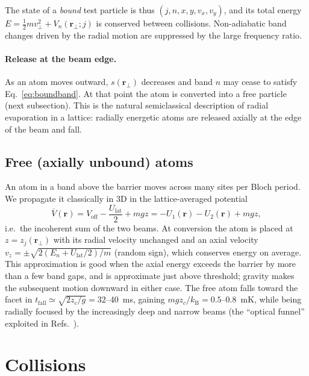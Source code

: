 \documentclass[11pt,a4paper]{article}
\newcommand{\kB}{k_\mathrm{B}}
\newcommand{\Ulat}{U_\mathrm{lat}}
\newcommand{\Voff}{V_\mathrm{off}}
\newcommand{\rperp}{\bm{r}_\perp}
\begin{document}
The state of a \emph{bound} test particle is thus $(j,n,x,y,v_x,v_y)$, and its total energy $E=\frac12 m v_\perp^2+V_n(\rperp;j)$ is conserved between collisions. Non-adiabatic band changes driven by the radial motion are suppressed by the large frequency ratio.

\paragraph{Release at the beam edge.} As an atom moves outward, $s(\rperp)$ decreases and band $n$ may cease to satisfy Eq.~\eqref{eq:boundband}. At that point the atom is converted into a free particle (next subsection). This is the natural semiclassical description of radial evaporation in a lattice: radially energetic atoms are released axially at the edge of the beam and fall.

\subsection{Free (axially unbound) atoms}
An atom in a band above the barrier moves across many sites per Bloch period. We propagate it classically in 3D in the lattice-averaged potential
\begin{equation}
\overline V(\bm r)=\Voff-\frac{\Ulat}{2}+mgz=-U_1(\bm r)-U_2(\bm r)+mgz ,
\label{eq:Vavg}
\end{equation}
i.e.\ the incoherent sum of the two beams. At conversion the atom is placed at $z=z_j(\rperp)$ with its radial velocity unchanged and an axial velocity $v_z=\pm\sqrt{2(E_n+\Ulat/2)/m}$ (random sign), which conserves energy on average. This approximation is good when the axial energy exceeds the barrier by more than a few band gaps, and is approximate just above threshold; gravity makes the subsequent motion downward in either case. The free atom falls toward the facet in $t_\mathrm{fall}\simeq\sqrt{2z_c/g}=32$--\SI{40}{ms}, gaining $mgz_c/\kB=0.5$--\SI{0.8}{mK}, while being radially focused by the increasingly deep and narrow beams (the ``optical funnel'' exploited in Refs.~\cite{Hilton2018,Okaba2014,Langbecker2018}).

\section{Collisions}
\label{sec:collisions}
\end{document}
